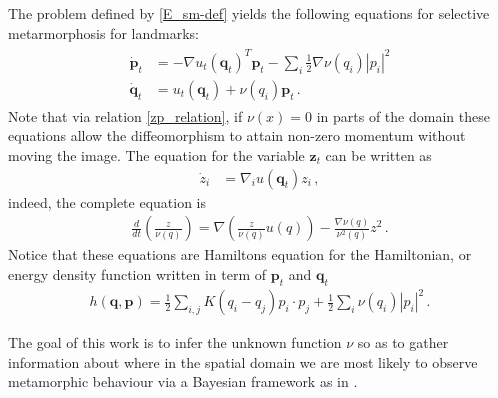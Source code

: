 \documentclass[runningheads]{llncs}
\begin{document}
The problem defined by \eqref{E_sm-def} yields the following equations for
selective metarmorphosis for landmarks:
\begin{align}
  \begin{split}
  \dot{\mathbf p}_t &= - \nabla u_t(\mathbf q_t)^T \mathbf p_t - \sum_i \frac12
  \nabla \nu(q_i) |p_i|^2\\ \dot{\mathbf q}_t &= u_t(\mathbf q_t) +
  \nu(q_i)\mathbf p_t \,.
\end{split}
  \label{eq-m-classic}
\end{align}
Note that via relation \eqref{zp_relation}, if $\nu(x)=0$ in parts of the domain
these equations allow the diffeomorphism to attain non-zero momentum without
moving the image. The equation for the variable $\mathbf z_t$ can be written as 
\begin{align}
  \dot  z_i &= \nabla_i u(\mathbf q_t) z_i\,, 
\end{align}
{\color{blue} indeed, the complete equation is 
\begin{align}
  \frac{d}{dt} \left ( \frac{z}{\nu(q)}\right) = \nabla \left ( \frac{z}{\nu(q)}
  u(q)\right ) - \frac{\nabla \nu(q)}{\nu^2(q)}z^2\, .
\end{align}
}
Notice that these equations are Hamiltons equation for the Hamiltonian, or
energy density function written in term of $\mathbf p_t$ and $\mathbf q_t$
\begin{align}
  h(\mathbf q, \mathbf p) =  \frac12 \sum_{i,j}K(q_i-q_j)p_i\cdot p_j+ \frac12
\sum_i \nu(q_i) |p_i|^2\,.  \end{align}

The goal of this work is to infer the unknown function $\nu$ so as to gather
information about where in the spatial domain we are most likely to observe
metamorphic behaviour via a Bayesian framework as in \cite{dashti2017bayesian}.
\end{document}
